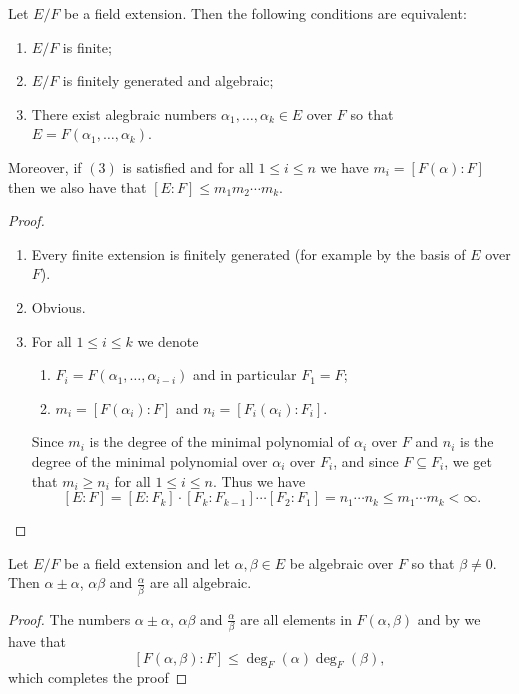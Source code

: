 \documentclass[11pt,a4paper]{article}
\begin{document}
\begin{proposition}
  \label{prop:equal-three}
  Let $E/F$ be a field extension.
  Then the following conditions are equivalent:
  \begin{enumerate}
    \item[(1)] $E/F$ is finite;
    \item[(2)] $E/F$ is finitely generated and algebraic;
    \item[(3)] There exist alegbraic numbers $\alpha_1,\dots,\alpha_k \in E$
      over $F$ so that $E = F(\alpha_1,\dots,\alpha_k)$.
  \end{enumerate}
  Moreover, if $(3)$ is satisfied and for all $1 \le i \le n$ we have
  $m_i = \left[F(\alpha) : F\right]$ then we also have that
  $[E : F] \le m_1m_2 \cdots m_k$.
\end{proposition}
\begin{proof} \phantom{}
  \begin{enumerate}
    \item[($1 \to 2$)]
      Every finite extension is finitely generated
      (for example by the basis of $E$ over $F$).
    \item[($2 \to 3$)] Obvious.
    \item[($3 \to 1$)] For all $1 \le i \le k$ we denote
      \begin{enumerate}
        \item[(a)] $F_i = F(\alpha_1,\dots,\alpha_{i-i})$ and in particular
          $F_1 = F$;
        \item[(b)] $m_i = \left[F(\alpha_i) : F\right]$
          and $n_i = \left[F_i(\alpha_i) : F_i\right]$. 
      \end{enumerate}
      Since $m_i$ is the degree of the minimal polynomial of $\alpha_i$
      over $F$ and $n_i$ is the degree of the minimal polynomial
      over $\alpha_i$ over $F_i$, and
      since $F \subseteq F_i$, we get that $m_i \geq n_i$ for all
      $1 \le i \le n$.
      Thus we have
      \[
        [E : F] = [E : F_k] \cdot [F_k : F_{k-1}] \cdots [F_2 : F_1] =
        n_1 \cdots n_k \le m_1 \cdots m_k < \infty.
      \]
  \end{enumerate}
\end{proof}

\begin{corollary}
  Let $E/F$ be a field extension
  and let $\alpha,\beta \in E$ be algebraic over $F$ so that
  $\beta \neq 0$.
  Then $\alpha \pm \alpha$, $\alpha \beta$ and $\frac{\alpha}{\beta}$
  are all algebraic.
\end{corollary}
\begin{proof}
  The numbers $\alpha \pm \alpha$, $\alpha \beta$ and $\frac{\alpha}{\beta}$
  are all elements in $F(\alpha,\beta)$
  and by  we have that
  \[
    \left[F(\alpha,\beta) : F\right] \le \deg_F(\alpha) \deg_F(\beta),
  \]
  which completes the proof
\end{proof}
\end{document}
